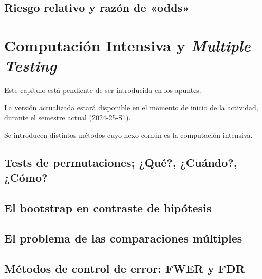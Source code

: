 \documentclass[
]{article}
\begin{document}
\subsection{Riesgo relativo y razón de «odds»}\label{riesgo-relativo-y-razuxf3n-de-odds}

\section{\texorpdfstring{Computación Intensiva y \emph{Multiple Testing}}{Computación Intensiva y Multiple Testing}}\label{computaciuxf3n-intensiva-y-multiple-testing}

Este capítulo está pendiente de ser introducida en los apuntes.

La versión actualizada estará disponible en el momento de inicio de la actividad, durante el semestre actual (2024-25-S1).

Se introducen distintos métodos cuyo nexo común es la computación intensiva.

\subsection{Tests de permutaciones; ¿Qué?, ¿Cuándo?, ¿Cómo?}\label{tests-de-permutaciones-quuxe9-cuuxe1ndo-cuxf3mo}

\subsection{El bootstrap en contraste de hipótesis}\label{el-bootstrap-en-contraste-de-hipuxf3tesis}

\subsection{El problema de las comparaciones múltiples}\label{el-problema-de-las-comparaciones-muxfaltiples}

\subsection{Métodos de control de error: FWER y FDR}\label{muxe9todos-de-control-de-error-fwer-y-fdr}
\end{document}
